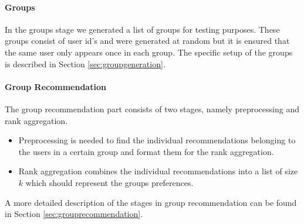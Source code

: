 \paragraph{Groups} In the groups stage we generated a list of groups for testing purposes. These groups consist of user id's and were generated at random but it is ensured that the same user only appears once in each group. The specific setup of the groups is described in Section \ref{sec:groupgeneration}.

\paragraph{Group Recommendation} The group recommendation part consists of two stages, namely preprocessing and rank aggregation.
\begin{itemize}
\item Preprocessing is needed to find the individual recommendations belonging to the users in a certain group and format them for the rank aggregation.
\item Rank aggregation combines the individual recommendations into a list of size $k$ which should represent the groups preferences.
\end{itemize}
A more detailed description of the stages in group recommendation can be found in Section \ref{sec:grouprecommendation}.


